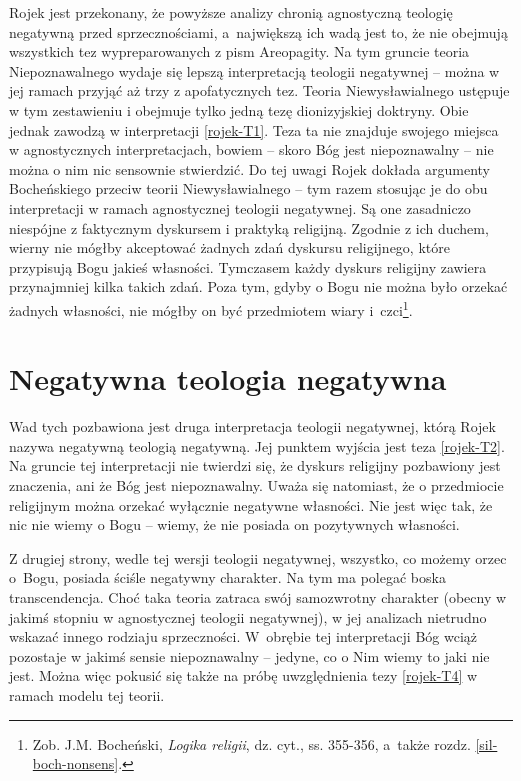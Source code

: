 Rojek jest przekonany, że powyższe analizy chronią agnostyczną teologię negatywną przed
sprzecznościami, a~największą ich wadą jest to, że nie obejmują wszystkich tez wypreparowanych z pism Areopagity.
Na tym gruncie teoria Niepoznawalnego wydaje się lepszą
interpretacją teologii negatywnej -- można w jej ramach
przyjąć aż trzy z apofatycznych tez. Teoria
Niewysławialnego ustępuje w tym zestawieniu  i obejmuje tylko jedną
tezę dionizyjskiej doktryny. Obie jednak zawodzą w interpretacji \eqref{rojek-T1}.
Teza ta nie znajduje swojego miejsca w agnostycznych 
interpretacjach, bowiem -- skoro Bóg jest niepoznawalny -- nie można o nim
nic sensownie stwierdzić.
Do tej uwagi Rojek dokłada argumenty Bocheńskiego przeciw teorii Niewysławialnego -- tym razem stosując je do obu interpretacji w ramach agnostycznej teologii negatywnej.
Są one zasadniczo niespójne z faktycznym dyskursem
i praktyką religijną. Zgodnie z ich duchem, wierny nie mógłby
akceptować żadnych zdań dyskursu religijnego, które przypisują Bogu
jakieś własności. Tymczasem każdy dyskurs religijny zawiera
przynajmniej kilka takich zdań. Poza tym, gdyby o Bogu nie można było
orzekać żadnych własności, nie mógłby on być przedmiotem wiary i~czci\footnote{
Zob. J.M. Bocheński, \textit{Logika religii}, dz. cyt., ss. 355-356, a~także rozdz. \ref{sil-boch-nonsens}.}.




\section{Negatywna teologia negatywna}

Wad tych pozbawiona jest druga interpretacja teologii negatywnej, którą
Rojek nazywa negatywną teologią negatywną. Jej punktem wyjścia jest
teza \eqref{rojek-T2}. Na gruncie tej interpretacji nie twierdzi się, że
dyskurs religijny pozbawiony jest znaczenia, ani że Bóg jest
niepoznawalny. Uważa się natomiast, że o przedmiocie religijnym można
orzekać wyłącznie negatywne własności. Nie jest więc tak, że nic nie
wiemy o Bogu -- wiemy, że nie posiada on pozytywnych własności.

Z drugiej strony, wedle tej wersji teologii negatywnej, wszystko, co możemy orzec o~Bogu,
posiada ściśle negatywny charakter. Na tym ma polegać boska transcendencja.
Choć taka teoria zatraca swój samozwrotny charakter (obecny w jakimś
stopniu w agnostycznej teologii negatywnej), w jej analizach nietrudno wskazać innego rodziaju sprzeczności. W~obrębie tej interpretacji Bóg
wciąż pozostaje w jakimś
sensie niepoznawalny -- jedyne, co o Nim wiemy to jaki nie jest. Można
więc pokusić się także na próbę uwzględnienia tezy \eqref{rojek-T4} w ramach modelu tej teorii.

